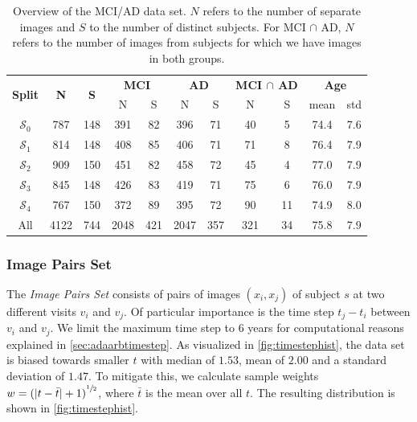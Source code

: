 \begin{table}[h]
	\begin{center}
		\begin{tabular}{c c c c c c c c c c c}
			\toprule
			\multirow{2}{*}{\bfseries Split} & 
			\multirow{2}{*}{\bfseries N} & 
			\multirow{2}{*}{\bfseries S} & 
			\multicolumn{2}{c}{\bfseries MCI} & 
			\multicolumn{2}{c}{\bfseries AD} & 
			\multicolumn{2}{c}{\bfseries MCI $\cap$ AD} &
			\multicolumn{2}{c}{\bfseries Age} \\
			\cmidrule(lr){4-5}
			\cmidrule(lr){6-7}
			\cmidrule(lr){8-9}
			\cmidrule(lr){10-11} 
			& & & N & S & N & S & N & S & mean & std \\ 
			\cmidrule(lr){1-11}
			$\mathcal{S}_0$ &  787 & 148 &  391 &  82 &  396 &  71 &  40 &  5 & 74.4 & 7.6 \\
			$\mathcal{S}_1$ &  814 & 148 &  408 &  85 &  406 &  71 &  71 &  8 & 76.4 & 7.9 \\
			$\mathcal{S}_2$ &  909 & 150 &  451 &  82 &  458 &  72 &  45 &  4 & 77.0 & 7.9 \\
			$\mathcal{S}_3$ &  845 & 148 &  426 &  83 &  419 &  71 &  75 &  6 & 76.0 & 7.9 \\
			$\mathcal{S}_4$ &  767 & 150 &  372 &  89 &  395 &  72 &  90 & 11 & 74.9 & 8.0 \\
			\cmidrule(lr){1-11}
			All             & 4122 & 744 & 2048 & 421 & 2047 & 357 & 321 & 34 & 75.8 & 7.9 \\
			\bottomrule
		\end{tabular}
		\caption{Overview of the MCI/AD data set. $N$ refers to the number of separate images and $S$ to the number of distinct subjects. For MCI $\cap$ AD, $N$ refers to the number of images from subjects for which we have images in both groups.}
		\label{tab:mciadset}
	\end{center}
\end{table}

\subsubsection*{Image Pairs Set} \label{sec:datpairs}
The \textit{Image Pairs Set} consists of pairs of images $(x_i, x_j)$ of subject $s$ at two different visits $v_i$ and $v_j$. Of particular importance is the time step $t_j - t_i$ between $v_i$ and $v_j$. We limit the maximum time step to 6 years for computational reasons explained in \autoref{sec:adaarbtimestep}. As visualized in \autoref{fig:timestephist}, the data set is biased towards smaller $t$ with median of $1.53$, mean of $2.00$ and a standard deviation of $1.47$. To mitigate this, we calculate sample weights $w = {(| t - \bar t | + 1)}^{\sfrac{1}{2}}$, where $\bar t$ is the mean over all $t$. The resulting distribution is shown in \autoref{fig:timestephist}.

